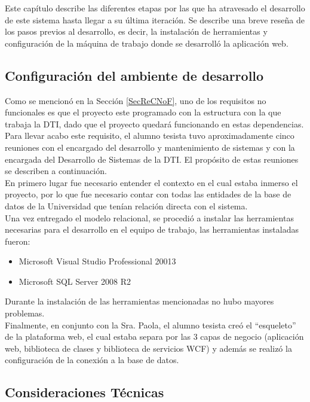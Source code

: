 Este capítulo describe las diferentes etapas por las que ha atravesado el desarrollo de
este sistema hasta llegar a su última iteración. Se describe una breve reseña de los pasos
previos al desarrollo, es decir, la instalación de herramientas y configuración de la máquina
de trabajo donde se desarrolló la aplicación web. 

\subsection{Configuración del ambiente de desarrollo}

Como se mencionó en la Sección \ref{SecReCNoF}, uno de los requisitos no funcionales es que el proyecto este programado con la estructura con la que trabaja la DTI, dado que el proyecto quedará funcionando en estas dependencias. Para llevar acabo este requisito, el alumno tesista tuvo aproximadamente cinco reuniones con el encargado del desarrollo y mantenimiento de sistemas y con la  encargada del Desarrollo de Sistemas de la DTI. El propósito de estas reuniones se describen a continuación.
\\

En primero lugar fue necesario entender el contexto en el cual estaba inmerso el proyecto, por lo que fue necesario contar con todas las entidades de la base de datos de la Universidad que tenían relación directa con el sistema.
\\

Una vez entregado el modelo relacional, se procedió a instalar las herramientas necesarias para el desarrollo en el equipo de trabajo, las herramientas instaladas fueron:
\begin{itemize}
	\item Microsoft Visual Studio Professional 20013
	\item Microsoft SQL Server 2008 R2
\end{itemize}

Durante la instalación de las herramientas mencionadas no hubo mayores problemas.
\\

Finalmente, en conjunto con la Sra. Paola, el alumno tesista creó el ``esqueleto'' de la plataforma web, el cual estaba separa por las 3 capas de negocio (aplicación web, biblioteca de clases y biblioteca de servicios WCF) y además se realizó la configuración de la conexión a la base de datos.



\subsection{Consideraciones Técnicas}

